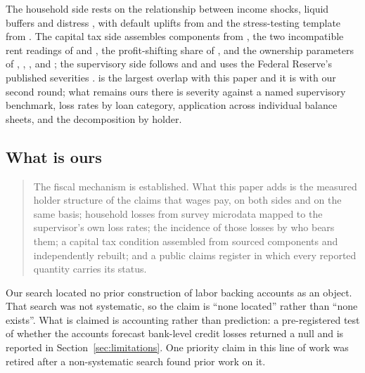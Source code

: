 The household side rests on the relationship between income shocks, liquid buffers and distress
\citep{MianRaoSufi2013,GanongNoel2020,BhuttaBrickerDettlingKelliherLaufer2019,MerikullRoom2020},
with default uplifts from \citet{GerardiHerkenhoffOhanianWillen2018} and the stress-testing
template from \citet{AlbaceteFessler2010}. The capital tax side assembles components from
\citet{Auerbach2017}, the two incompatible rent readings of \citet{Barkai2020} and
\citet{KarabarbounisNeiman2014}, the profit-shifting share of \citet{TorslovWierZucman2023}, and
the ownership parameters of \citet{RosenthalAustin2016}, \citet{RosenthalBurke2020},
\citet{RosenthalMucciolo2024}, \citet{Gravelle2022} and \citet{CBO2014}; the supervisory side
follows \citet{Schuermann2014} and \citet{HirtleKovnerVickeryBhanot2016} and uses the Federal
Reserve's published severities \citep{FRBDFAST2026}. \citet{Chen2026} is the largest overlap with
this paper and it is with our second round; what remains ours there is severity against a named
supervisory benchmark, loss rates by loan category, application across individual balance sheets,
and the decomposition by holder.

\subsection{What is ours}

\begin{quote}
The fiscal mechanism is established. What this paper adds is the measured holder structure of the
claims that wages pay, on both sides and on the same basis; household losses from survey
microdata mapped to the supervisor's own loss rates; the incidence of those losses by who bears
them; a capital tax condition assembled from sourced components and independently rebuilt; and a
public claims register in which every reported quantity carries its status.
\end{quote}

Our search located no prior construction of labor backing accounts as an object. That search was
not systematic, so the claim is ``none located'' rather than ``none exists''. What is claimed is
accounting rather than prediction: a pre-registered test of whether the accounts forecast
bank-level credit losses returned a null and is reported in Section~\ref{sec:limitations}. One priority claim
in this line of work was retired after a non-systematic search found prior work on it.
